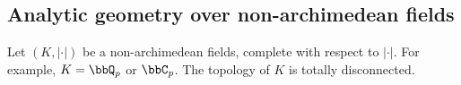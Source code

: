 

\subsection[status=draft,label=\labelNFM{subsec:ana}]{Analytic geometry over non-archimedean fields}

Let $(K,|\cdot|)$ be a non-archimedean fields, complete with respect to $|\cdot|$.
For example, $K = \bbQ_p$ or $\bbC_p$.
The topology of $K$ is totally disconnected.













































